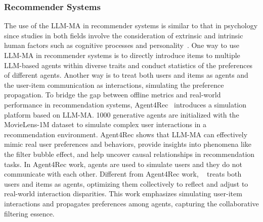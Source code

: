 \subsubsection{Recommender Systems}
The use of the LLM-MA in recommender systems is similar to that in psychology since studies in both fields involve the consideration of extrinsic and intrinsic human factors such as cognitive processes and personality~\cite{PsychologyInformedRecommenderSystems}. One way to use LLM-MA in recommender systems is to directly introduce items to multiple LLM-based agents within diverse traits and conduct statistics of the preferences of different agents. Another way is to treat both users and items as agents and the user-item communication as interactions, simulating the preference propagation. To bridge the gap between offline metrics and real-world performance in recommendation systems, Agent4Rec~\cite{zhang2023generative} introduces a simulation platform based on LLM-MA. 1000 generative agents are initialized with the MovieLens-1M dataset to simulate complex user interactions in a recommendation environment. 
Agent4Rec shows that LLM-MA can effectively mimic real user preferences and behaviors, provide insights into phenomena like the filter bubble effect, and help uncover causal relationships in recommendation tasks. In Agent4Rec work, agents are used to simulate users and they do not communicate with each other. Different from Agent4Rec work, ~\cite{zhang2023agentcf} treats both users and items as agents, optimizing them collectively to reflect and adjust to real-world interaction disparities. This work emphasizes simulating user-item interactions and propagates preferences among agents, capturing the collaborative filtering essence.

